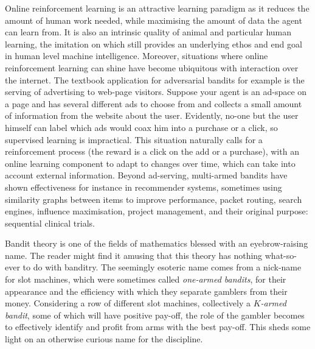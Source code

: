 \par Online reinforcement learning is an attractive learning paradigm as it reduces the amount of human work needed, while maximising the amount of data the agent can learn from. It is also an intrinsic quality of animal and particular human learning, the imitation on which still provides an underlying ethos and end goal in human level machine intelligence. Moreover, situations where online reinforcement learning can shine have become ubiquitous with interaction over the internet. The textbook application for adversarial bandits for example is the serving of advertising to web-page visitors. Suppose your agent is an ad-space on a page and has several different ads to choose from and collects a small amount of information from the website about the user. Evidently, no-one but the user himself can label which ads would coax him into a purchase or a click, so supervised learning is impractical. This situation naturally calls for a reinforcement process (the reward is a click on the add or a purchase), with an online learning component to adapt to changes over time, which can take into account external information. Beyond ad-serving\cite{vernade:2017,dudik:2011}, multi-armed bandits have shown effectiveness for instance in recommender systems, sometimes using similarity graphs between items to improve performance\cite{valko:2014}, packet routing\cite{awerbuch:2004}, search engines\cite{yue:2009}, influence maximisation\cite{vaswani:2015}, project management\cite{gittins:1979}, and their original purpose: sequential clinical trials\cite{thompson:1933,lai-robbins:1985}. 



\par  Bandit theory is one of the fields of mathematics blessed with an eyebrow-raising name. The reader might find it amusing that this theory has nothing what-so-ever to do with banditry.  The seemingly esoteric name comes from a nick-name for slot machines, which were sometimes called {\em one-armed bandits}, for their appearance and the efficiency with which they separate gamblers from their money. Considering a row of different slot machines, collectively a {\em $K$-armed bandit}, some of which will have positive pay-off, the role of the gambler becomes to effectively identify and profit from arms with the best pay-off. This sheds some light on an otherwise curious name for the discipline. 

